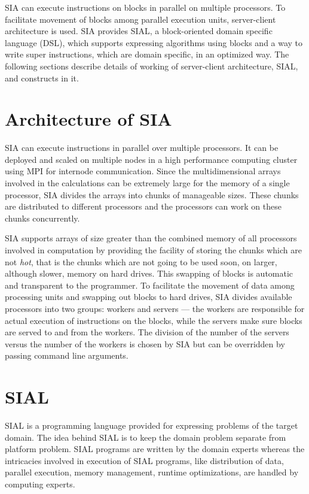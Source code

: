 SIA can execute instructions on blocks in parallel on multiple processors. To
facilitate movement of blocks among parallel execution units, server-client
architecture is used. SIA provides SIAL, a block-oriented domain specific
language (DSL), which supports expressing algorithms using blocks and a way
to write super instructions, which are domain specific, in an optimized way. The
following sections describe details of working of server-client architecture,
SIAL, and constructs in it.

\section{Architecture of SIA}\label{siaarch}
SIA can execute instructions in parallel over multiple processors. It can be
deployed and scaled on multiple nodes in a high performance computing cluster
using MPI for internode communication. Since the
multidimensional arrays involved in the calculations can be extremely large for
the memory of a single processor, SIA divides the arrays into chunks of
manageable sizes. These chunks are distributed to different processors and the
processors can work on these chunks concurrently.

SIA supports arrays of size greater than the combined memory of all processors
involved in computation by providing the facility of storing the chunks which are
not \textit{hot}, that is the chunks which are not going to be used soon, on
larger, although slower, memory on hard drives. This swapping of blocks is automatic
and transparent to the programmer. To facilitate the movement of data among
processing units and swapping out blocks to hard drives, SIA divides available
processors into two groups: workers and servers --- the workers are responsible for
actual execution of instructions on the blocks, while the servers make sure blocks
are served to and from the workers. The division of the number of the servers versus the number
of the workers is chosen by SIA but can be overridden by passing command line
arguments.

\section{SIAL}
SIAL is a programming language provided for expressing problems of the target
domain. The idea behind SIAL is to keep the domain problem separate from
platform problem. SIAL programs are written by the domain experts
whereas the intricacies involved in execution of SIAL programs, like distribution of
data, parallel execution, memory management, runtime optimizations, are handled
by computing experts.

